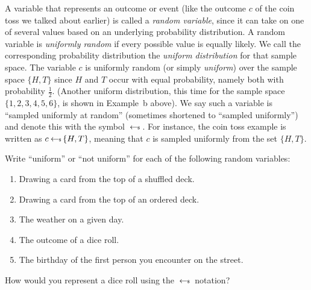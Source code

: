 A variable that represents an outcome or event (like the outcome $c$ of the coin toss we talked about earlier) is called a \emph{random 
variable}, since it can take on one of several values based on an underlying 
probability distribution. A random variable is \emph{uniformly random} if every possible 
value is equally likely. We call the corresponding probability distribution the 
\emph{uniform distribution} for that sample space. The variable $c$ is uniformly random (or simply \emph{uniform}) over the sample space $\{H, T\}$
since $H$ and $T$ occur with equal probability, namely both with probability 
$\frac{1}{2}$. (Another uniform distribution, this time for the sample space $\{1, 2, 3, 4, 5, 6\}$, is shown in Example~b above). We say such a variable is ``sampled uniformly at random'' 
(sometimes shortened to ``sampled uniformly'') and denote this with the symbol 
$\hskip2.3pt{\gets\!\!\mbox{\tiny${\$}$\normalsize}}\,$. For instance, the coin toss example is written as $c \hskip2.3pt{\gets\!\!\mbox{\tiny${\$}$\normalsize}}\, \{H, T\}$, 
meaning that $c$ is sampled uniformly from the set $\{H, T\}$.


\begin{exercise}
    Write ``uniform'' or ``not uniform'' for each of the following random variables:
    \renewcommand{\labelenumi}{(\alph{enumi})} 
    \begin{enumerate}
        \item Drawing a card from the top of a shuffled deck.
        \item Drawing a card from the top of an ordered deck.
        \item The weather on a given day.
        \item The outcome of a dice roll.
        \item The birthday of the first person you encounter on the street.
    \end{enumerate}
\end{exercise}

\begin{exercise}
    How would you represent a dice roll using the $\hskip2.3pt{\gets\!\!\mbox{\tiny${\$}$\normalsize}}\,$ notation?
\end{exercise}

